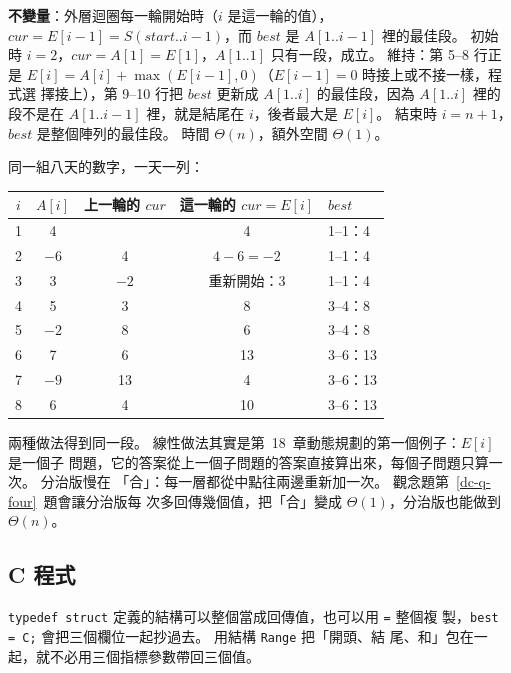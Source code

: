 \textbf{不變量}：外層迴圈每一輪開始時（$i$ 是這一輪的值），$\mathit{cur} =
E[i-1] = S(\mathit{start}..i-1)$，而 $\mathit{best}$ 是 $A[1..i-1]$ 裡的最佳段。
初始時 $i = 2$，$\mathit{cur} = A[1] = E[1]$，$A[1..1]$ 只有一段，成立。 維持：第
5--8 行正是 $E[i] = A[i] + \max(E[i-1], 0)$（$E[i-1] = 0$ 時接上或不接一樣，程式選
擇接上），第 9--10 行把 $\mathit{best}$ 更新成 $A[1..i]$ 的最佳段，因為
$A[1..i]$ 裡的段不是在 $A[1..i-1]$ 裡，就是結尾在 $i$，後者最大是 $E[i]$。 結束時
$i = n + 1$，$\mathit{best}$ 是整個陣列的最佳段。 時間 $\Theta(n)$，額外空間
$\Theta(1)$。

同一組八天的數字，一天一列：

\begin{center}
\begin{tabular}{ccccl}
\toprule
$i$ & $A[i]$ & 上一輪的 $\mathit{cur}$ & 這一輪的 $\mathit{cur} = E[i]$ & $\mathit{best}$ \\
\midrule
1 & 4 & & 4 & 1--1：4 \\
2 & $-6$ & 4 & $4 - 6 = -2$ & 1--1：4 \\
3 & 3 & $-2$ & 重新開始：3 & 1--1：4 \\
4 & 5 & 3 & 8 & 3--4：8 \\
5 & $-2$ & 8 & 6 & 3--4：8 \\
6 & 7 & 6 & 13 & 3--6：13 \\
7 & $-9$ & 13 & 4 & 3--6：13 \\
8 & 6 & 4 & 10 & 3--6：13 \\
\bottomrule
\end{tabular}
\end{center}

兩種做法得到同一段。 線性做法其實是第~18~章動態規劃的第一個例子：$E[i]$ 是一個子
問題，它的答案從上一個子問題的答案直接算出來，每個子問題只算一次。 分治版慢在
「合」：每一層都從中點往兩邊重新加一次。 觀念題第~\ref{dc-q-four}~題會讓分治版每
次多回傳幾個值，把「合」變成 $\Theta(1)$，分治版也能做到 $\Theta(n)$。

\subsection{C 程式}

\begin{cbookrecap}[第~14~章 14.2、14.4、14.6 節]
\texttt{typedef struct} 定義的結構可以整個當成回傳值，也可以用 \texttt{=} 整個複
製，\texttt{best = C;} 會把三個欄位一起抄過去。 用結構 \texttt{Range} 把「開頭、結
尾、和」包在一起，就不必用三個指標參數帶回三個值。
\end{cbookrecap}

